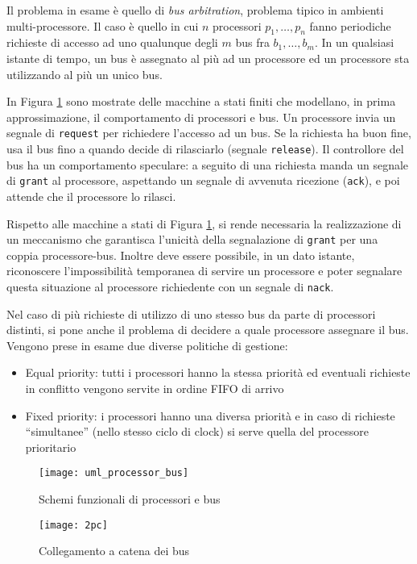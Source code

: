 Il problema in esame è quello di \textit{bus arbitration}, problema tipico in ambienti multi-processore. Il caso è quello in cui $n$ processori ${p_1, \dots, p_n}$  fanno periodiche richieste di accesso ad uno qualunque degli $m$ bus fra ${b_1, \dots, b_m}$. In un qualsiasi istante di tempo, un bus è assegnato al più ad un processore ed un processore sta utilizzando al più un unico bus.

In Figura \ref{Fig:uml} sono mostrate delle macchine a stati finiti che modellano, in prima approssimazione, il comportamento di processori e bus. Un processore invia un segnale di \texttt{request} per richiedere l'accesso ad un bus. Se la richiesta ha buon fine, usa il bus fino a quando decide di rilasciarlo (segnale \texttt{release}). Il controllore del bus ha un comportamento speculare: a seguito di una richiesta manda un segnale di \texttt{grant} al processore, aspettando un segnale di avvenuta ricezione (\texttt{ack}), e poi attende che il processore lo rilasci.

Rispetto alle macchine a stati di Figura \ref{Fig:uml}, si rende necessaria la realizzazione di un meccanismo che garantisca l'unicità della segnalazione di \texttt{grant} per una coppia processore-bus. Inoltre deve essere possibile, in un dato istante, riconoscere l'impossibilità temporanea di servire un processore e poter segnalare questa situazione al processore richiedente con un segnale di \texttt{nack}.

Nel caso di più richieste di utilizzo di uno stesso bus da parte di processori distinti, si pone anche il problema di decidere a quale processore assegnare il bus. Vengono prese in esame due diverse politiche di gestione:
\begin{itemize}
\item Equal priority:  tutti i processori hanno la stessa priorità ed eventuali richieste in conflitto vengono servite in ordine FIFO di arrivo
\item Fixed priority:  i processori hanno una diversa priorità e in caso di richieste \textquotedblleft simultanee\textquotedblright{} (nello stesso ciclo di clock) si serve quella del processore prioritario
\end{itemize}

\begin{figure}
\texttt{[image: uml\_processor\_bus]}
\caption{Schemi funzionali di processori e bus}
\label{Fig:uml}
\end{figure}
\begin{figure}
\texttt{[image: 2pc]}
\caption{Collegamento a catena dei bus}
\label{Fig:2pc}
\end{figure}

